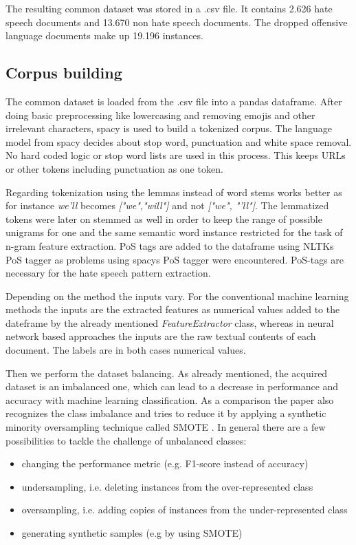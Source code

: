 The resulting common dataset was stored in a .csv file. It contains 2.626 hate speech documents and 13.670 non hate speech documents. The dropped offensive language documents make up 19.196 instances. 

\subsection{Corpus building}

The common dataset is loaded from the .csv file into a pandas dataframe. After doing basic preprocessing like lowercasing and removing emojis and other irrelevant characters, spacy is used to build a tokenized corpus. The language model from spacy decides about stop word, punctuation and white space removal. No hard coded logic or stop word lists are used in this process. This keeps URLs or other tokens including punctuation as one token. 

Regarding tokenization using the lemmas instead of word stems works better as for instance \textit{we'll} becomes \textit{["we","will"]} and not \textit{["we", "'ll"]}. The lemmatized tokens were later on stemmed as well in order to keep the range of possible unigrams for one and the same semantic word instance restricted for the task of n-gram feature extraction. PoS tags are added to the dataframe using NLTKs PoS tagger as problems using spacys PoS tagger were encountered. PoS-tags are necessary for the hate speech pattern extraction.

Depending on the method the inputs vary. For the conventional machine learning methods the inputs are the extracted features as numerical values added to the dateframe by the already mentioned \textit{Feature\-Extractor} class, whereas in neural network based approaches the inputs are the raw textual contents of each document. The labels are in both cases numerical values.

Then we perform the dataset balancing. As already mentioned, the acquired dataset is an imbalanced one, which can lead to a decrease in performance and accuracy with machine learning classification. As a comparison the paper \cite{Oriola2020} also recognizes the class imbalance and tries to reduce it by applying a synthetic minority oversampling technique called SMOTE \cite{Chawla2011}. In general there are a few possibilities to tackle the challenge of unbalanced classes:

\begin{itemize}
    \item changing the performance metric (e.g. F1-score instead of accuracy)
    \item undersampling, i.e. deleting instances from the over-represented class
    \item oversampling, i.e. adding copies of instances from the under-represented class
    \item generating synthetic samples (e.g by using SMOTE)
\end{itemize}

